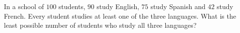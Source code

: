 In a school of $100$ students, $90$ study English, $75$ study Spanish and $42$ study French. Every student studies at least one of the three languages. What is the least possible number of students who study all three languages?
